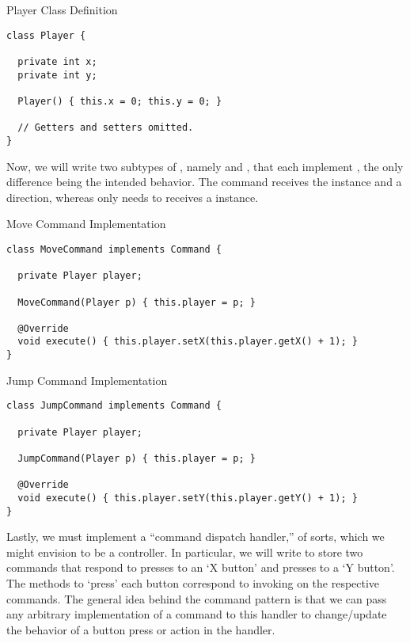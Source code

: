 \begin{cl}{Player Class Definition}
\begin{lstlisting}[language=MyJava]
class Player {
  
  private int x;
  private int y;

  Player() { this.x = 0; this.y = 0; }

  // Getters and setters omitted.
}
\end{lstlisting}
\end{cl}

Now, we will write two subtypes of , namely  and , that each implement , the only difference being the intended behavior. The  command receives the  instance and a direction, whereas  only needs to receives a  instance. 

\begin{cl}{Move Command Implementation}
\begin{lstlisting}[language=MyJava]
class MoveCommand implements Command {

  private Player player;

  MoveCommand(Player p) { this.player = p; }

  @Override
  void execute() { this.player.setX(this.player.getX() + 1); }
}
\end{lstlisting}
\end{cl}

\begin{cl}{Jump Command Implementation}
\begin{lstlisting}[language=MyJava]
class JumpCommand implements Command {
  
  private Player player;

  JumpCommand(Player p) { this.player = p; }

  @Override
  void execute() { this.player.setY(this.player.getY() + 1); }
}
\end{lstlisting}
\end{cl}

Lastly, we must implement a ``command dispatch handler,'' of sorts, which we might envision to be a controller. In particular, we will write  to store two commands that respond to presses to an `X button' and presses to a `Y button'. The methods to `press' each button correspond to invoking  on the respective commands. The general idea behind the command pattern is that we can pass any arbitrary implementation of a command to this handler to change/update the behavior of a button press or action in the handler. 

